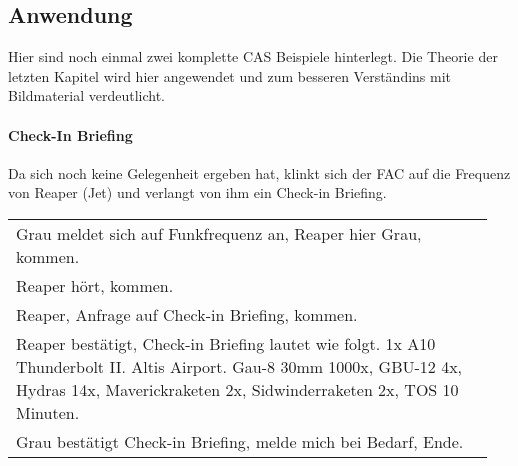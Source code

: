 \subsection{Anwendung}
	Hier sind noch einmal zwei komplette CAS Beispiele hinterlegt. Die Theorie der letzten Kapitel wird hier angewendet und zum besseren Verständins mit Bildmaterial verdeutlicht.

\paragraph*{Check-In Briefing}
	Da sich noch keine Gelegenheit ergeben hat, klinkt sich der FAC auf die Frequenz von Reaper (Jet) und verlangt von ihm ein Check-in Briefing.
	\begin{longtable}{P{0.95\linewidth}}
	\toprule
	Grau meldet sich auf Funkfrequenz an, Reaper hier Grau, kommen.\\
	\rcg Reaper hört, kommen.\\
	Reaper, Anfrage auf Check-in Briefing, kommen.\\
	\rcg Reaper bestätigt, Check-in Briefing lautet wie folgt. 1x A10 Thunderbolt II. Altis Airport.
	Gau-8 30mm 1000x, GBU-12 4x, Hydras 14x, Maverickraketen 2x, Sidwinderraketen 2x,
	TOS 10 Minuten.\\
	Grau bestätigt Check-in Briefing, melde mich bei Bedarf, Ende.\\
	\bottomrule
	\end{longtable}

